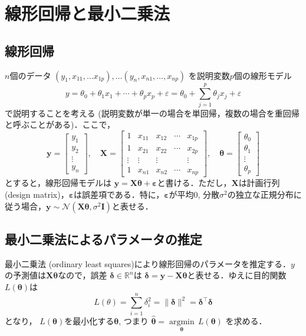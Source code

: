 \section{線形回帰と最小二乗法}
\subsection{線形回帰}
$n$個のデータ $\left(y_1,x_{11}, \ldots x_{1p}\right),\ldots \left(y_n,x_{n1},\ldots, x_{np}\right)$ を説明変数$p$個の線形モデル 
\begin{equation}
y=\theta_0+\theta_1x_1+\cdots+\theta_px_p+\varepsilon=\theta_0+\sum_{j=1}^p \theta_jx_j+\varepsilon
\end{equation}
で説明することを考える (説明変数が単一の場合を単回帰，複数の場合を重回帰と呼ぶことがある)．ここで， 
\begin{equation}
\mathbf{y}= \left[ \begin{array}{c} y_1\\ y_2\\ \vdots \\ y_n \end{array} \right],\quad 
\mathbf{X}=\left[ \begin{array}{ccccc} 1 & x_{11}& x_{12} &\cdots & x_{1p} \\ 1& x_{21}& x_{22}&\cdots & x_{2p}\\ \vdots & \vdots& \vdots& & \vdots \\1 &x_{n1} & x_{n2} &\cdots & x_{np} \end{array} \right],\quad
\mathbf{\theta}= \left[ \begin{array}{c} \theta_0\\ \theta_1\\ \vdots \\ \theta_p \end{array} \right]
\end{equation}
とすると，線形回帰モデルは $\mathbf{y}=\mathbf{X}\mathbf{\theta}+\mathbf{\varepsilon}$と書ける．ただし，$\mathbf{X}$は計画行列 (design matrix)，$\mathbf{\varepsilon}$は誤差項である．特に，$\mathbf{\varepsilon}$が平均0, 分散$\sigma^2$の独立な正規分布に従う場合，$\mathbf{y}\sim \mathcal{N}(\mathbf{X}\mathbf{\theta}, \sigma^2\mathbf{I})$と表せる．
\subsection{最小二乗法によるパラメータの推定}
最小二乗法 (ordinary least squares)により線形回帰のパラメータを推定する．$y$の予測値は$\mathbf{X} \mathbf{\theta}$なので，誤差 $\mathbf{\delta} \in \mathbb{R}^n$は
$\mathbf{\delta} = \mathbf{y}-\mathbf{X} \mathbf{\theta}$と表せる．ゆえに目的関数$L(\mathbf{\theta})$は 
\begin{equation}
L(\theta)=\sum_{i=1}^n \delta_i^2 = \|\mathbf{\delta}\|^2=\mathbf{\delta}^\top \mathbf{\delta}
\end{equation}
となり， $L(\mathbf{\theta})$を最小化する$\mathbf{\theta}$, つまり $\hat {\mathbf {\theta }}={\underset {\mathbf {\theta}}{\operatorname {arg min} }}\,L({\mathbf{\theta}})$
を求める．

